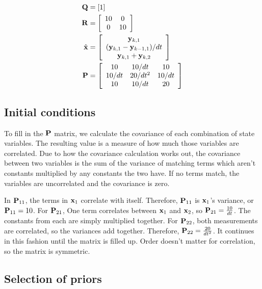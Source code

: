 \begin{align}
  \mathbf{Q} &= \left[1\right] \\
  \mathbf{R} &= \left[
  \begin{array}{cc}
    10 & 0 \\
    0 & 10
  \end{array} \right] \\
  \hat{\mathbf{x}} &= \left[
  \begin{array}{c}
    \mathbf{y}_{k,1} \\
    (\mathbf{y}_{k,1} - \mathbf{y}_{k-1,1})/dt \\
    \mathbf{y}_{k,1} + \mathbf{y}_{k,2}
  \end{array} \right] \\
  \mathbf{P} &= \left[
  \begin{array}{ccc}
    10 & 10/dt & 10 \\
    10/dt & 20/dt^2 & 10/dt \\
    10 & 10/dt & 20
  \end{array} \right]
\end{align}

\subsection{Initial conditions}

To fill in the $\mathbf{P}$ matrix, we calculate the covariance of each combination
of state variables. The resulting value is a measure of how much those variables
are correlated. Due to how the covariance calculation works out, the covariance
between two variables is the sum of the variance of matching terms which aren't
constants multiplied by any constants the two have. If no terms match, the
variables are uncorrelated and the covariance is zero.

In $\mathbf{P}_{11}$, the terms in $\mathbf{x}_1$ correlate with itself. Therefore,
$\mathbf{P}_{11}$ is $\mathbf{x}_1$'s variance, or $\mathbf{P}_{11} = 10$. For
$\mathbf{P}_{21}$, One term correlates between $\mathbf{x}_1$ and $\mathbf{x}_2$, so
$\mathbf{P}_{21} = \frac{10}{dt}$. The constants from each are simply multiplied
together. For $\mathbf{P}_{22}$, both measurements are correlated, so the variances
add together. Therefore, $\mathbf{P}_{22} = \frac{20}{dt^2}$. It continues in this
fashion until the matrix is filled up. Order doesn't matter for correlation, so
the matrix is symmetric.

\subsection{Selection of priors}

